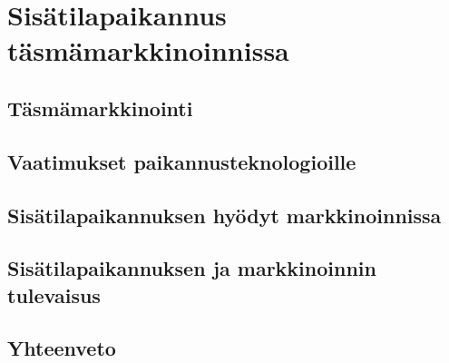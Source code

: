 \section{Sisätilapaikannus täsmämarkkinoinnissa}
\subsection{Täsmämarkkinointi}
\subsection{Vaatimukset paikannusteknologioille}
\subsection{Sisätilapaikannuksen hyödyt markkinoinnissa}
\subsection{Sisätilapaikannuksen ja markkinoinnin tulevaisus}
\subsection{Yhteenveto}
